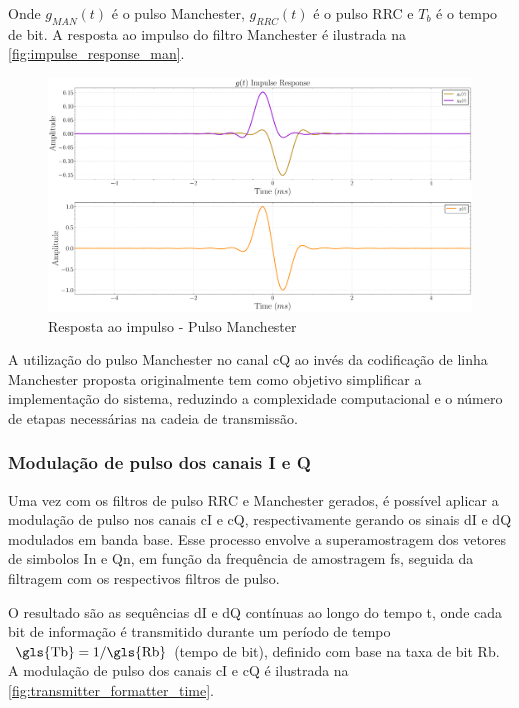 Onde $g_{MAN}(t)$ é o pulso Manchester, $g_{RRC}(t)$ é o pulso RRC e $T_b$ é o tempo de bit. A resposta ao impulso do filtro \gls{Manchester} é ilustrada na \autoref{fig:impulse_response_man}.

\begin{figure}[H]
	\centering
	\caption{Resposta ao impulso - Pulso Manchester}\label{fig:impulse_response_man}
	\includegraphics[width=\linewidth]{assets/cap3/example_formatter_impulse_man.pdf}
\end{figure}

A utilização do pulso \gls{Manchester} no canal \gls{cQ} ao invés da codificação de linha \gls{Manchester} proposta originalmente tem como objetivo simplificar a implementação do sistema, reduzindo a complexidade computacional e o número de etapas necessárias na cadeia de transmissão. 

\subsubsection{Modulação de pulso dos canais I e Q}

Uma vez com os filtros de pulso \gls{RRC} e \gls{Manchester} gerados, é possível aplicar a modulação de pulso nos canais \gls{cI} e \gls{cQ}, respectivamente gerando os sinais \gls{dI} e \gls{dQ} modulados em banda base. Esse processo envolve a superamostragem dos vetores de simbolos \gls{In} e \gls{Qn}, em função da frequência de amostragem \gls{fs}, seguida da filtragem com os respectivos filtros de pulso. 

O resultado são as sequências \gls{dI} e \gls{dQ} contínuas ao longo do tempo \gls{t}, onde cada bit de informação é transmitido durante um período de tempo $\text{ \gls{Tb}} = 1/ \text{\gls{Rb}}$ (tempo de bit), definido com base na taxa de bit \gls{Rb}. A modulação de pulso dos canais \gls{cI} e \gls{cQ} é ilustrada na \autoref{fig:transmitter_formatter_time}.

